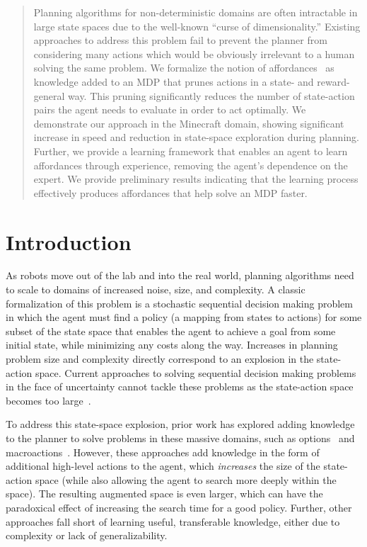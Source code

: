 \documentclass[conference]{IEEEtran}
\begin{document}
\begin{abstract}
Planning algorithms for non-deterministic domains are often
intractable in large state spaces due to the well-known ``curse of
dimensionality.'' Existing approaches to address this problem fail to
prevent the planner from considering many actions which would be
obviously irrelevant to a human solving the same problem. We formalize the notion of affordances~\citep{gibson77} 
as knowledge added to an MDP that prunes actions in a state- and reward- general
way. This pruning significantly reduces the number of state-action
pairs the agent needs to evaluate in order to act optimally. We
demonstrate our approach in the Minecraft domain, showing significant
increase in speed and reduction in state-space exploration during planning. Further, we provide a
learning framework that enables an agent to learn affordances through
experience, removing the agent's dependence on the expert. We provide
preliminary results indicating that the learning process effectively
produces affordances that help solve an MDP faster.
\end{abstract}

\IEEEpeerreviewmaketitle

\section{Introduction}
\label{sec:introduction}
As robots move out of the lab and into the real world, planning
algorithms need to scale to domains of increased noise, size, and
complexity.  A classic formalization of this problem is a stochastic
sequential decision making problem in which the agent must find a
policy (a mapping from states to actions) for some subset of the state
space that enables the agent to achieve a goal from some initial
state, while minimizing any costs along the way.
Increases in planning problem size and complexity directly correspond
to an explosion in the state-action space. Current approaches to solving 
sequential decision making problems in the face of uncertainty cannot tackle these problems 
as the state-action space becomes too large~\citep{grounds05}.

To address this state-space explosion, prior work has explored adding
knowledge to the planner to solve problems in these
massive domains, such as options~\citep{sutton99} and
macroactions~\citep{Botea:2005kx,Newton:2005vn}. However, these
approaches add knowledge in the form of additional high-level actions
to the agent, which {\em increases} the size of the state-action space
(while also allowing the agent to search more deeply within the
space).  The resulting augmented space is even larger, which can have
the paradoxical effect of increasing the search time for a good
policy. Further, other approaches fall short of learning useful, transferable knowledge,
either due to complexity or lack of generalizability.
\end{document}
